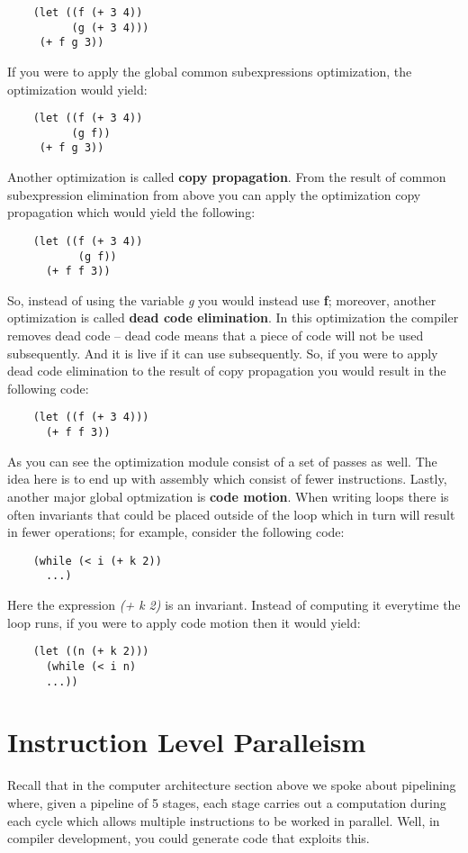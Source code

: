 \documentclass{amsbook}
\begin{document}
\begin{lstlisting}
    (let ((f (+ 3 4))
          (g (+ 3 4)))
     (+ f g 3))
\end{lstlisting}
If you were to apply the global common subexpressions optimization, the optimization would yield:

\begin{lstlisting}
    (let ((f (+ 3 4))
          (g f))
     (+ f g 3))
\end{lstlisting}
Another optimization is called \textbf{copy propagation}. From the result of common subexpression elimination from above you can apply the optimization copy propagation which would yield the following:

\begin{lstlisting}
    (let ((f (+ 3 4))
           (g f))
      (+ f f 3))
\end{lstlisting}
So, instead of using the variable \textit{g} you would instead use \textbf{f}; moreover, another optimization is called \textbf{dead code elimination}. In this optimization the compiler removes dead code -- dead code means that a piece of code will not be used subsequently. And it is live if it can use subsequently. So, if you were to apply dead code elimination to the result of copy propagation you would result in the following code:

\begin{lstlisting}
    (let ((f (+ 3 4)))
      (+ f f 3))
\end{lstlisting}
As you can see the optimization module consist of a set of passes as well. The idea here is to end up with assembly which consist of fewer instructions. Lastly, another major global optmization is \textbf{code motion}. When writing loops there is often invariants that could be placed outside of the loop which in turn will result in fewer operations; for example, consider the following code:

\begin{lstlisting}
    (while (< i (+ k 2))
      ...)
\end{lstlisting}
Here the expression \textit{(+ k 2)} is an invariant. Instead of computing it everytime the loop runs, if you were to apply code motion then it would yield:

\begin{lstlisting}
    (let ((n (+ k 2)))
      (while (< i n)
      ...))
\end{lstlisting}
\section{Instruction Level Paralleism}
Recall that in the computer architecture section above we spoke about pipelining where, given a pipeline of 5 stages, each stage carries out a computation during each cycle which allows multiple instructions to be worked in parallel. Well, in compiler development, you could generate code that exploits this.
\end{document}
